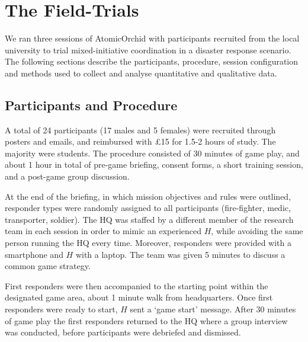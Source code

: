 \section{The Field-Trials}\label{sec:evaluation}
\noindent We ran three sessions of AtomicOrchid with participants recruited from the local university to trial mixed-initiative coordination in a disaster response scenario. The following sections describe the participants, procedure, session configuration and methods used to collect and analyse quantitative and qualitative data.

\subsection{Participants and Procedure}
\noindent  A total of 24 participants (17 males and 5 females) were recruited through posters and emails, and reimbursed with \pounds 15  for 1.5-2 hours of study. The majority were students. The procedure consisted of 30 minutes of game play, and about 1 hour in total of pre-game briefing, consent forms,  a short training session, and a post-game group discussion. 


At the end of the briefing, in which mission objectives and rules were outlined, responder types were randomly assigned to all participants (fire-fighter, medic, transporter, soldier). The HQ was staffed by a different member of the research team in each session in order to mimic an experienced $H$, while avoiding the same person running the HQ every time.  Moreover, responders were provided with a smartphone and $H$ with a laptop. The team was given 5 minutes to discuss a common game strategy. 

First responders were then accompanied to the starting point within the designated game area, about 1 minute walk from headquarters. Once first responders were ready to start, $H$ sent a `game start' message. After 30 minutes of game play the first responders returned to the HQ where a group interview was conducted, before participants were debriefed and dismissed.

